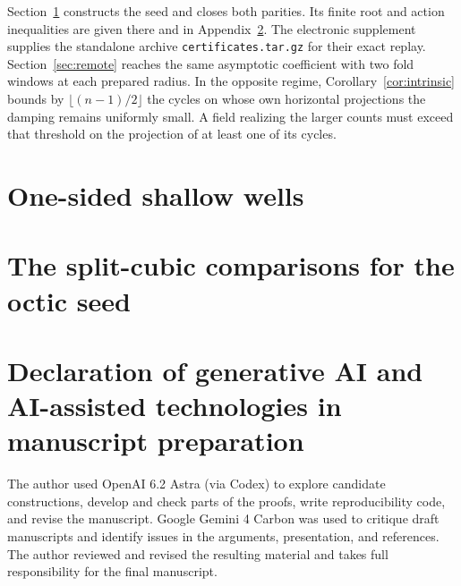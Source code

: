 \documentclass[11pt]{article}
\begin{document}
Section~\ref{sec:wells} constructs the seed and closes both parities.
Its finite root and action inequalities are given there and in
Appendix~\ref{app:cubic}. The electronic supplement supplies the
standalone archive \texttt{certificates.tar.gz} for their exact replay.
Section~\ref{sec:remote} reaches the same asymptotic coefficient with two
fold windows at each prepared radius. In the opposite regime,
Corollary~\ref{cor:intrinsic} bounds by $\lfloor(n-1)/2\rfloor$ the cycles
on whose own horizontal projections the damping remains uniformly small.
A field realizing the larger counts must exceed that threshold on the
projection of at least one of its cycles.



\section{One-sided shallow wells}\label{sec:wells}




\appendix

\section{The split-cubic comparisons for the octic seed}\label{app:cubic}

\section*{Declaration of generative AI and AI-assisted technologies in manuscript preparation}
The author used OpenAI 6.2 Astra (via Codex) to explore candidate constructions, develop and check parts of the proofs, write reproducibility code, and revise the manuscript. Google Gemini 4 Carbon was used to critique draft manuscripts and identify issues in the arguments, presentation, and references. The author reviewed and revised the resulting material and takes full responsibility for the final manuscript.


\end{document}
